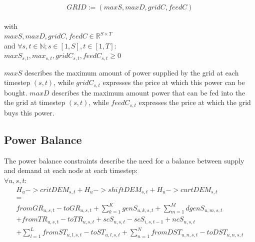 \documentclass[
	11pt,								%
	DIV10,								%
	a4paper,         					%
	oneside,							%
	headheight=20pt,					%
	footheight=20pt,					%
    parskip=full,						%
    listof=totoc,						%
	bibliography=totoc,					%
	index=totoc,						%
]{scrartcl}
\begin{document}
\begin{equation}
	GRID:= (maxS, maxD, gridC, feedC)
\end{equation}\\
with\\
$maxS,maxD, gridC, feedC \in \mathbb{R}^{S \times T}$\\
and $\forall s,t \in \mathbb{N};s \in [1,S], t \in [1,T]$: \\
$maxS_{s,t}, max_{s,t}, gridC_{s,t}, feedC_{s,t} \geq 0$

$maxS$ describes the maximum amount of power supplied by the grid at each timestep $(s,t)$, while $gridC_{s,t}$ expresses the price at which this power can be bought.
$maxD$ describes the maximum amount power that can be fed into the the grid at timestep $(s,t)$, while $feedC_{s,t}$ expresses the price at which the grid buys this power. 





\subsection{Power Balance}
The power balance constraints describe the need for a balance between supply and demand at each node at each timestep: \\

$\forall u,s,t$:
\begin{equation}
	\begin{split}
		H_u->critDEM_{s,t} + H_u->shiftDEM_{s,t} + H_u->curtDEM_{s,t}\\
		= \\
		fromGR_{u,s,t} - toGR_{u,s,t} + \sum_{k=1}^K{genS_{u,k,s,t}} + \sum_{m=1}^M{dgenS_{u,m,s,t}} \\ 
		+ fromTR_{u,s,t} - toTR_{u,s,t} + scS_{u,s,t} - scS_{i,s,t-1} + ncS_{u,s,t} \\
		+ \sum_{l=1}^L{fromST_{u,l,s,t} - toST_{u,l,s,t}} + \sum_{n=1}^N{fromDST_{u,n,s,t}-toDST_{u,n,s,t}}
	\end{split}
\end{equation}

\end{document}
